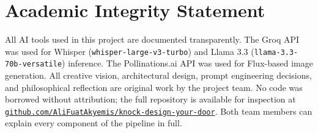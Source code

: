 \documentclass[12pt, a4paper]{article}
\begin{document}
\section{Academic Integrity Statement}

All AI tools used in this project are documented transparently. The Groq API was used
for Whisper (\texttt{whisper-large-v3-turbo}) and Llama 3.3
(\texttt{llama-3.3-70b-versatile}) inference. The Pollinations.ai API was used for
Flux-based image generation. All creative vision, architectural design, prompt
engineering decisions, and philosophical reflection are original work by the project
team. No code was borrowed without attribution; the full repository is available for
inspection at
\href{https://github.com/AliFuatAkyemis/knock-design-your-door}%
     {\texttt{github.com/AliFuatAkyemis/knock-design-your-door}}.
Both team members can explain every component of the pipeline in full.
\end{document}
